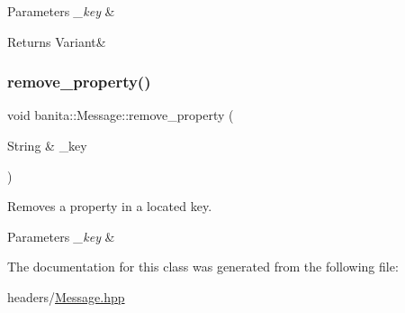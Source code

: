 \begin{DoxyParams}{Parameters}
{\em \+\_\+key} & \\
\hline
\end{DoxyParams}
\begin{DoxyReturn}{Returns}
Variant\& 
\end{DoxyReturn}
\mbox{\label{classbanita_1_1_message_af38e2a1b0ab69d111ba296f549665e13}} 
\subsubsection{\texorpdfstring{remove\_property()}{remove\_property()}}
{\footnotesize\ttfamily void banita\+::\+Message\+::remove\+\_\+property (\begin{DoxyParamCaption}\item[{String \&}]{\+\_\+key }\end{DoxyParamCaption})\hspace{0.3cm}{\ttfamily [inline]}}



Removes a property in a located key. 


\begin{DoxyParams}{Parameters}
{\em \+\_\+key} & \\
\hline
\end{DoxyParams}


The documentation for this class was generated from the following file\+:\begin{DoxyCompactItemize}
\item 
headers/\mbox{\hyperlink{_message_8hpp}{Message.\+hpp}}\end{DoxyCompactItemize}
